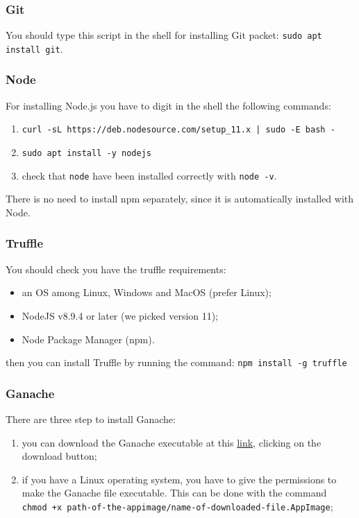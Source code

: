 \subsubsection{Git}
You should type this script in the shell for installing Git packet: \texttt{sudo apt install git}.

\subsubsection{Node}
For installing Node.js you have to digit in the shell the following commands:
\begin{enumerate}
	\item \texttt{curl -sL https://deb.nodesource.com/setup\_11.x | sudo -E bash -}
	\item \texttt{sudo apt install -y nodejs}
	\item check that \texttt{node} have been installed correctly with \texttt{node -v}.
\end{enumerate}
There is no need to install npm separately, since it is automatically installed with Node.

\subsubsection{Truffle}
You should check you have the truffle requirements:
\begin{itemize}
	\item an OS among Linux, Windows and MacOS (prefer Linux);
	\item NodeJS v8.9.4 or later (we picked version 11);
	\item Node Package Manager (npm).
\end{itemize}
then you can install Truffle by running the command: \texttt{npm install -g truffle}

\subsubsection{Ganache}
There are three step to install Ganache:
\begin{enumerate}
	\item you can download the Ganache executable at this \href{https://truffleframework.com/ganache}{link}, clicking on the download button;
	\item if you have a Linux operating system, you have to give the permissions to make the Ganache file executable. This can be done with the command \\\texttt{chmod +x path-of-the-appimage/name-of-downloaded-file.AppImage};
\end{enumerate}

